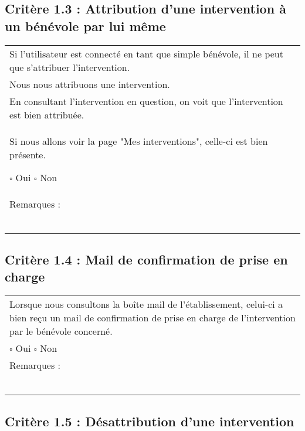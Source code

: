 	\subsection*{Critère 1.3 : Attribution d’une intervention à un bénévole par lui même}
	
		\begin{center}
    	 		\begin{tabular}[h]{|p{}|}
			\hline
				Si l’utilisateur est connecté en tant que simple bénévole, il ne peut que s’attribuer l’intervention.\\
Nous nous attribuons une intervention.\\
En consultant l’intervention en question, on voit que l’intervention est bien attribuée.\\
Si nous allons voir la page "Mes interventions", celle-ci est bien présente.
				
				$\square$ Oui \hfill \hfill $\square$ Non \\\hline Remarques : \\ ~\\
			 \\\hline
     		\end{tabular}
  		\end{center}	

	\subsection*{Critère 1.4 : Mail de confirmation de prise en charge}
	
		\begin{center}
    	 		\begin{tabular}[h]{|p{}|}
			\hline
				Lorsque nous consultons la boîte mail de l’établissement, celui-ci a bien reçu un mail de confirmation de prise en charge de l’intervention par le bénévole concerné. \\
				
				$\square$ Oui \hfill \hfill $\square$ Non \\\hline Remarques : \\ ~\\
			 \\\hline
     		\end{tabular}
  		\end{center}	

	\subsection*{Critère 1.5 : Désattribution d’une intervention}
	
